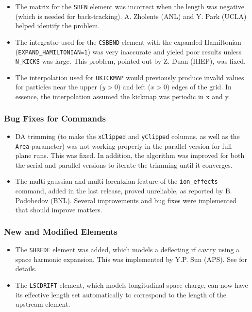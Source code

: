 \documentclass[11pt]{article}
\begin{document}
\begin{itemize}
\item The matrix for the \verb|SBEN| element was incorrect when the length was negative (which is needed for
  back-tracking). A. Zholents (ANL) and Y. Park (UCLA) helped identify the problem.
\item The integrator used for the \verb|CSBEND| element with the expanded Hamiltonian (\verb|EXPAND_HAMILTONIAN=1|)
  was very inaccurate and yieled poor results unless \verb|N_KICKS| was large. This problem, pointed out by Z. Duan (IHEP),
  was fixed.
\item The interpolation used for \verb|UKICKMAP| would previously produce invalid values for particles near the upper ($y>0$) and
  left ($x>0$) edges of the grid. In essence, the interpolation assumed the kickmap was periodic in x and y.
\end{itemize}

\subsubsection{Bug Fixes for Commands}
\begin{itemize}
\item DA trimming (to make the \verb|xClipped| and \verb|yClipped| columns, as well as the \verb|Area| parameter)
  was not working properly in the parallel version for full-plane runs. This was fixed. In addition, the algorithm was improved for
  both the serial and parallel versions to iterate the trimming until it converges.
\item The multi-gaussian and multi-lorentzian feature of the \verb|ion_effects| command, added in the last release, proved unreliable, 
  as reported by B. Podobedov (BNL). Several improvements and bug fixes were implemented that should improve
  matters.
\end{itemize}

\subsubsection{New and Modified Elements}
\begin{itemize}
\item The \verb|SHRFDF| element was added, which models a deflecting rf cavity using a space harmonic expansion.
  This was implemented by Y.P. Sun (APS). See \cite{Sun-NAPAC19} for details.
\item The \verb|LSCDRIFT| element, which models longitudinal space charge, can now have its effective length
  set automatically to correspond to the length of the upstream element.
\end{itemize}
\end{document}
